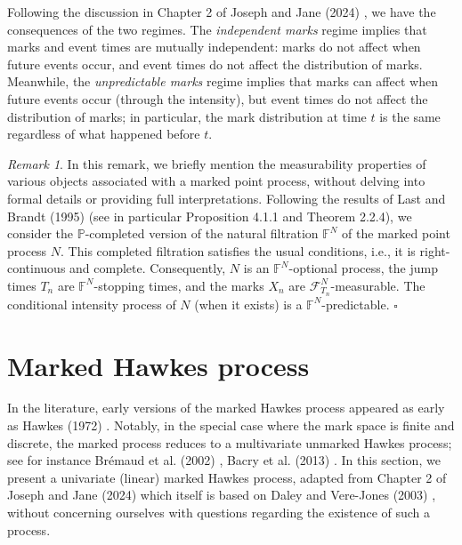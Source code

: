\documentclass[12pt,a4paper]{report}
\theoremstyle{plain}
\theoremstyle{definition}
\theoremstyle{remark}
\newtheorem{remark}{Remark}[section]
\newcommand{\1}{\mathbf{1}}
\begin{document}
\noindent
Following the discussion in Chapter 2 of Joseph and Jane (2024) \cite{JJ24}, we have the consequences of the two regimes. The \emph{independent marks} regime implies that marks and event times are mutually independent: marks do not affect when future events occur, and event times do not affect the distribution of marks. Meanwhile, the \emph{unpredictable marks} regime implies that marks can affect when future events occur (through the intensity), but event times do not affect the distribution of marks; in particular, the mark distribution at time $t$ is the same regardless of what happened before $t$.

\begin{remark}
In this remark, we briefly mention the measurability properties of various objects associated with a marked point process, without delving into formal details or providing full interpretations. Following the results of Last and Brandt (1995) \cite{LB95} (see in particular Proposition 4.1.1 and Theorem 2.2.4), we consider the $\mathbb{P}$-completed version of the natural filtration $\mathbb{F}^N$ of the marked point process $N$. This completed filtration satisfies the usual conditions, i.e., it is right-continuous and complete. Consequently, $N$ is an $\mathbb{F}^N$-optional process, the jump times $T_n$ are $\mathbb{F}^N$-stopping times, and the marks $X_n$ are $\mathcal{F}^N_{T_n}$-measurable. The conditional intensity process of $N$ (when it exists) is a $\mathbb{F}^N$-predictable.
\hfill $\square$
\end{remark}

\section{Marked Hawkes process}
\label{sec:3.2}
In the literature, early versions of the marked Hawkes process appeared as early as Hawkes (1972) \cite{Haw72}. Notably, in the special case where the mark space is finite and discrete, the marked process reduces to a multivariate unmarked Hawkes process; see for instance Br\'emaud et al. (2002) \cite{Bre02}, Bacry et al. (2013) \cite{Bac13}. In this section, we present a univariate (linear) marked Hawkes process, adapted from Chapter 2 of Joseph and Jane (2024) \cite{JJ24} which itself is based on Daley and Vere-Jones (2003) \cite{DVJ03}, without concerning ourselves with questions regarding the existence of such a process.
\end{document}
